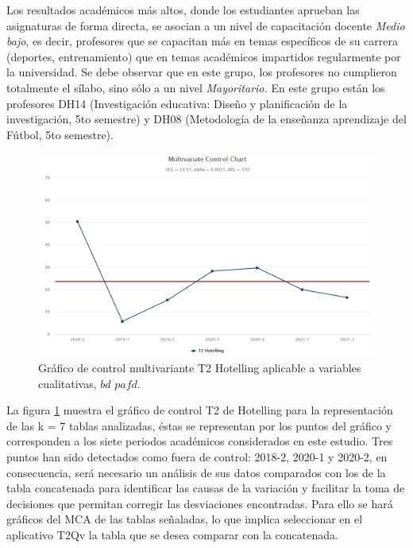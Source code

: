 \documentclass[mathematics,article,submit,moreauthors,pdftex]{mdpi}
\begin{document}
Los resultados académicos más altos, donde los estudiantes aprueban las
asignaturas de forma directa, se asocian a un nivel de capacitación
docente \emph{Medio bajo}, es decir, profesores que se capacitan más en
temas específicos de su carrera (deportes, entrenamiento) que en temas
académicos impartidos regularmente por la universidad. Se debe observar
que en este grupo, los profesores no cumplieron totalmente el sílabo,
sino sólo a un nivel \emph{Mayoritario.} En este grupo están los
profesores DH14 (Investigación educativa: Diseño y planificación de la
investigación, 5to semestre) y DH08 (Metodología de la enseñanza
aprendizaje del Fútbol, 5to semestre).

\begin{figure}[H]


\begin{center}\includegraphics[width=0.9\linewidth,]{tdos_edu} \end{center}

\caption{Gráfico de control multivariante T2 Hotelling aplicable a variables cualitativas, $bd$ $pafd$.}
\label{fig:tdosedu}
\end{figure}

La figura \ref{fig:tdosedu} muestra el gráfico de control T2 de
Hotelling para la representación de las k = 7 tablas analizadas, éstas
se representan por los puntos del gráfico y corresponden a los siete
periodos académicos considerados en este estudio. Tres puntos han sido
detectados como fuera de control: 2018-2, 2020-1 y 2020-2, en
consecuencia, será necesario un análisis de sus datos comparados con los
de la tabla concatenada para identificar las causas de la variación y
facilitar la toma de decisiones que permitan corregir las desviaciones
encontradas. Para ello se hará gráficos del MCA de las tablas señaladas,
lo que implica seleccionar en el aplicativo T2Qv la tabla que se desea
comparar con la concatenada.
\end{document}
